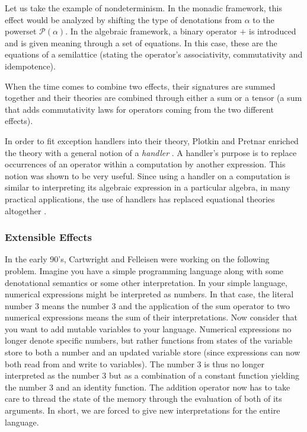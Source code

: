 Let us take the example of nondeterminism. In the monadic framework, this
effect would be analyzed by shifting the type of denotations from $\alpha$
to the powerset $\mathcal{P}(\alpha)$. In the algebraic framework, a binary
operator $+$ is introduced and is given meaning through a set of equations.
In this case, these are the equations of a semilattice (stating the
operator's associativity, commutativity and idempotence).

When the time comes to combine two effects, their signatures are summed
together and their theories are combined through either a sum or a tensor
(a sum that adds commutativity laws for operators coming from the two
different effects).

In order to fit exception handlers into their theory, Plotkin and Pretnar
enriched the theory with a general notion of a \emph{handler}
\cite{plotkin2013handling}. A handler's purpose is to replace occurrences
of an operator within a computation by another expression. This notion was
shown to be very useful. Since using a handler on a computation is similar
to interpreting its algebraic expression in a particular algebra, in many
practical applications, the use of handlers has replaced equational
theories altogether
\cite{bauer2012programming,kammar2013handlers,brady2013programming}.

\subsubsection*{Extensible Effects}

In the early 90's, Cartwright and Felleisen were working on the following
problem. Imagine you have a simple programming language along with some
denotational semantics or some other interpretation. In your simple
language, numerical expressions might be interpreted as numbers. In that
case, the literal number 3 means the number 3 and the application of the
sum operator to two numerical expressions means the sum of their
interpretations. Now consider that you want to add mutable variables to
your language. Numerical expressions no longer denote specific numbers, but
rather functions from states of the variable store to both a number and an
updated variable store (since expressions can now both read from and write
to variables). The number 3 is thus no longer interpreted as the number 3
but as a combination of a constant function yielding the number 3 and an
identity function. The addition operator now has to take care to thread the
state of the memory through the evaluation of both of its arguments. In
short, we are forced to give new interpretations for the entire language.

